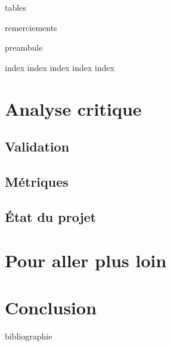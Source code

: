 


\frontmatter

{tables}

\glsaddall
\printglossary

{remerciements}

{preambule}

\mainmatter


{index}
{index}
{index}
{index}
{index}

\chapter{Analyse critique}
\section{Validation}
\section{Métriques}
\section{État du projet}

 
\chapter{Pour aller plus loin}

\chapter{Conclusion}

\backmatter

{bibliographie}

